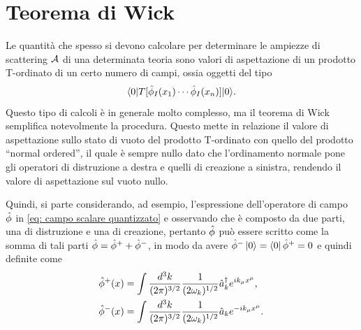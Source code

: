 \section{Teorema di Wick}
Le quantità che spesso si devono calcolare per determinare le ampiezze di scattering $\mathcal{A}$ di una determinata teoria sono valori di aspettazione di un prodotto T-ordinato di un certo numero di campi, ossia oggetti del tipo
\begin{equation}
    \langle 0 | T[\hat{\phi}_I(x_1)\cdots\hat{\phi}_I(x_n)] | 0 \rangle.
\end{equation}
Questo tipo di calcoli è in generale molto complesso, ma il teorema di Wick semplifica notevolmente la procedura. Questo mette in relazione il valore di aspettazione sullo stato di vuoto del prodotto T-ordinato con quello del prodotto ``normal ordered'', il quale è sempre nullo dato che l'ordinamento normale pone gli operatori di distruzione a destra e quelli di creazione a sinistra, rendendo il valore di aspettazione sul vuoto nullo.

Quindi, si parte considerando, ad esempio, l'espressione dell'operatore di campo $\hat{\phi}$ in \eqref{eq: campo scalare quantizzato} e osservando che è composto da due parti, una di distruzione e una di creazione, pertanto $\hat{\phi}$ può essere scritto come la somma di tali parti $\hat{\phi}=\hat{\phi}^++\hat{\phi}^-$, in modo da avere $\hat{\phi}^-\ket{0}=\bra{0}\hat{\phi}^+=0$ e quindi definite come
\begin{align}
\label{componenti campo + e -}
    \hat{\phi}^+(x) &= \int\frac{d^3k}{(2\pi)^{3/2}}\frac{1}{(2\omega_k)^{1/2}}\hat{a}_k^\dagger e^{ik_\mu x^\mu}, \\
    \hat{\phi}^-(x) &= \int\frac{d^3k}{(2\pi)^{3/2}}\frac{1}{(2\omega_k)^{1/2}}\hat{a}_ke^{-ik_\mu x^\mu}.
\end{align}

